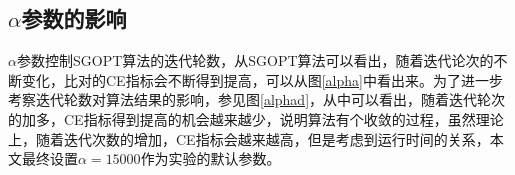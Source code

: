 \subsection{$\alpha$参数的影响}

$\alpha$参数控制SGOPT算法的迭代轮数，从SGOPT算法可以看出，随着迭代论次的不断变化，比对的CE指标会不断得到提高，可以从图\ref{alpha}中看出来。为了进一步考察迭代轮数对算法结果的影响，参见图\ref{alphad}，从中可以看出，随着迭代轮次的加多，CE指标得到提高的机会越来越少，说明算法有个收敛的过程，虽然理论上，随着迭代次数的增加，CE指标会越来越高，但是考虑到运行时间的关系，本文最终设置$\alpha=15000$作为实验的默认参数。

\begin{figure}[htbp]
\end{figure}

